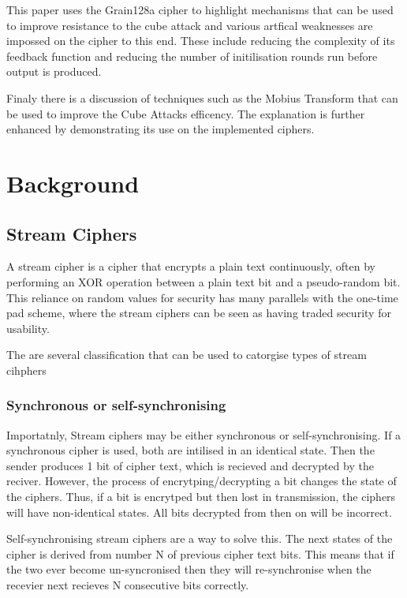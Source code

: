 \documentclass{report}
\begin{document}
This paper uses the Grain128a cipher to highlight mechanisms that can be used to improve resistance to the cube attack and various artfical weaknesses are impossed on the cipher to this end. These include reducing the complexity of its feedback function and reducing the number of initilisation rounds run before output is produced.

Finaly there is a discussion of techniques such as the Mobius Transform that can be used to improve the Cube Attacks efficency. The explanation is further enhanced by demonstrating its use on the implemented ciphers.

\chapter{Background}
\section{Stream Ciphers}
A stream cipher is a cipher that encrypts a plain text continuously, often by performing an XOR operation between a plain text bit and a pseudo-random bit. This reliance on random values for security has many parallels with the one-time pad scheme, where the stream ciphers can be seen as having traded security for usability.

The are several classification that can be used to catorgise types of stream cihphers

\subsection{Synchronous or self-synchronising}
Importatnly, Stream ciphers may be either synchronous or self-synchronising. If a synchronous cipher is used, both are intilised in an identical state. Then the sender produces 1 bit of cipher text, which is recieved and decrypted by the reciver. However, the process of encrytping/decrypting a bit changes the state of the ciphers. Thus, if a bit is encrytped but then lost in transmission, the ciphers will have non-identical states. All bits decrypted from then on will be incorrect.

Self-synchronising stream ciphers are a way to solve this. The next states of the cipher is derived from number N of previous cipher text bits. This means that if the two ever become un-syncronised then they will re-synchronise when the recevier next recieves N consecutive bits correctly.

\end{document}
